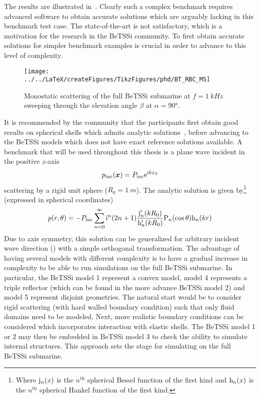 The results are illustrated in~. Clearly such a complex benchmark requires advanced software to obtain accurate solutions which are arguably lacking in this benchmark test case. The state-of-the-art is not satisfactory, which is a motivation for the research in the BeTSSi community. To first obtain accurate solutions for simpler benchmark examples is crucial in order to advance to this level of complexity.
\begin{figure}
	\centering
	\texttt{[image: ../../LaTeX/createFigures/TikzFigures/phd/BT\_RBC\_MS]}
	\caption{Monostatic scattering of the full BeTSSi submarine at $f=\SI{1}{kHz}$ sweeping through the elevation angle $\beta$ at $\alpha=\ang{90}$.}
	\label{Fig:BT_RBC_MS}
\end{figure}
It is recommended by the community that the participants first obtain good results on spherical shells which admits analytic solutions~\cite{Venas2019e3s}, before advancing to the BeTSSi models which does not have exact reference solutions available.
A benchmark that will be used throughout this thesis is a plane wave incident in the positive $z$-axis
\begin{equation*}
	p_{\mathrm{inc}}(\vec{x}) = P_{\mathrm{inc}}\euler^{\imag k x_3}
\end{equation*} 
scattering by a rigid unit sphere ($R_0=\SI{1}{m}$). The analytic solution is given by\footnote{Where $\mathrm{j}_n(x)$ is the $n^{\mathrm{th}}$ spherical Bessel function of the first kind and $\mathrm{h}_n(x)$ is the $n^{\mathrm{th}}$ spherical Hankel function of the first kind.} (expressed in spherical coordinates)
\begin{equation}\label{Eq:S1rigid}
	p(r,\theta) = -P_{\mathrm{inc}}\sum_{n=0}^\infty \mathrm{i}^n (2n+1) \frac{\mathrm{j}_n'(kR_0)}{\mathrm{h}_n'(kR_0)} \mathrm{P}_n(\cos\theta)\mathrm{h}_n(kr)
\end{equation}
Due to axis symmetry, this solution can be generalized for arbitrary incident wave direction () with a simple orthogonal transformation. The advantage of having several models with different complexity is to have a gradual increase in complexity to be able to run simulations on the full BeTSSi submarine. In particular, the BeTSSi model 1 represent a convex model, model 4 represents a triple reflector (which can be found in the more advance BeTSSi model 2) and model 5 represent disjoint geometries. The natural start would be to consider rigid scattering (with hard walled boundary condition) such that only fluid domains need to be modeled. Next, more realistic boundary conditions can be considered which incorporates interaction with elastic shells. The BeTSSi model 1 or 2 may then be embedded in BeTSSi model 3 to check the ability to simulate internal structures. This approach sets the stage for simulating on the full BeTSSi submarine.